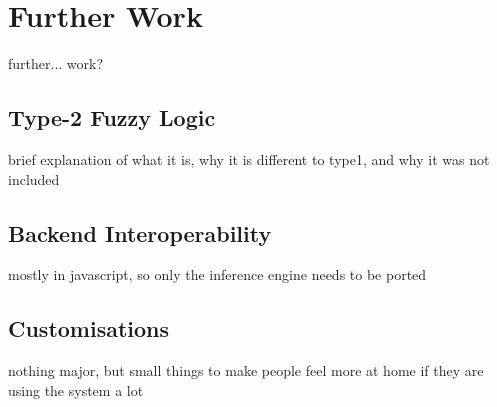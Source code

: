 \section{Further Work}
{\color{red}further... work?}

\subsection{Type-2 Fuzzy Logic}
\label{sec:type2}

{\color{red} brief explanation of what it is, why it is different to type1, and why it was not included}

\subsection{Backend Interoperability}
{\color{red} mostly in javascript, so only the inference engine needs to be ported}


\subsection{Customisations}

{\color{red} 
nothing major, but small things to make people feel more at home if they are using the system a lot}

